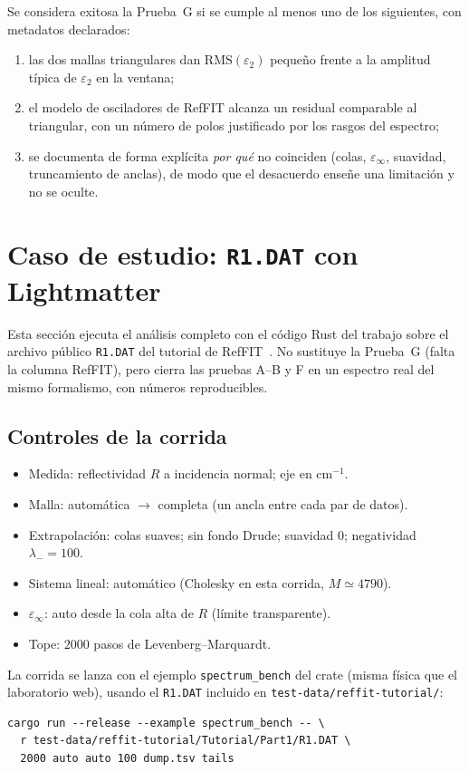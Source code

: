 Se considera exitosa la Prueba~G si se cumple al menos uno de los siguientes, con metadatos declarados:
\begin{enumerate}[leftmargin=*]
\item las dos mallas triangulares dan $\mathrm{RMS}(\varepsilon_2)$ peque\~no frente a la amplitud t\'ipica de $\varepsilon_2$ en la ventana;
\item el modelo de osciladores de RefFIT alcanza un residual comparable al triangular, con un n\'umero de polos justificado por los rasgos del espectro;
\item se documenta de forma expl\'icita \emph{por qu\'e} no coinciden (colas, $\varepsilon_\infty$, suavidad, truncamiento de anclas), de modo que el desacuerdo ense\~ne una limitaci\'on y no se oculte.
\end{enumerate}


\chapter{Caso de estudio: \texttt{R1.DAT} con Lightmatter}
\label{ch:r1}

Esta secci\'on ejecuta el an\'alisis completo con el c\'odigo Rust del trabajo sobre el archivo p\'ublico \texttt{R1.DAT} del tutorial de RefFIT~\cite{guide}.
No sustituye la Prueba~G (falta la columna RefFIT), pero cierra las pruebas A--B y F en un espectro real del mismo formalismo, con n\'umeros reproducibles.

\section{Controles de la corrida}

\begin{itemize}[leftmargin=*]
\item Medida: reflectividad $R$ a incidencia normal; eje en cm$^{-1}$.
\item Malla: autom\'atica $\to$ completa (un ancla entre cada par de datos).
\item Extrapolaci\'on: colas suaves; sin fondo Drude; suavidad $0$; negatividad $\lambda_-=100$.
\item Sistema lineal: autom\'atico (Cholesky en esta corrida, $M\simeq 4790$).
\item $\varepsilon_\infty$: auto desde la cola alta de $R$ (l\'imite transparente).
\item Tope: $2000$ pasos de Levenberg--Marquardt.
\end{itemize}
La corrida se lanza con el ejemplo \texttt{spectrum\_bench} del crate (misma f\'isica que el laboratorio web), usando el \texttt{R1.DAT} incluido en \texttt{test-data/reffit-tutorial/}:
\begin{verbatim}
cargo run --release --example spectrum_bench -- \
  r test-data/reffit-tutorial/Tutorial/Part1/R1.DAT \
  2000 auto auto 100 dump.tsv tails
\end{verbatim}

